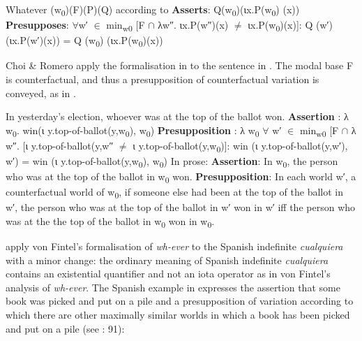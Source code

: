 \ea %
\label{bkm:Ref533762404}  Whatever (w\textsubscript{0})(F)(P)(Q) according to \citet{Fintel2000}
\ea  \textbf{Asserts}: Q(w\textsubscript{0})(ιx.P(w\textsubscript{0}) (x))
\ex \textbf{Presupposes}: ${\forall}$w′ ${\in}$ min\textsubscript{w0} [F ${\cap}$ λw″. ιx.P(w″)(x) ${\neq}$ ιx.P(w\textsubscript{0})(x)]: Q (w′) (ιx.P(w′)(x)) = Q (w\textsubscript{0}) (ιx.P(w\textsubscript{0})(x))
\z
\z

Choi \& Romero apply the formalisation in  to the sentence in . The modal base F is counterfactual, and thus a presupposition of counterfactual variation is conveyed, as in .

\ea \label{bkm:Ref150779072} %
\ea In yesterday’s election, whoever was at the top of the ballot won.
\ea \textbf{Assertion} : λ w\textsubscript{0}. win(ι y.top-of-ballot(y,w\textsubscript{0}), w\textsubscript{0})
\ex \textbf{Presupposition} \label{ex:key:100b}: λ w\textsubscript{0} ${\forall}$ w′ ${\in}$ min\textsubscript{w0} [F ${\cap}$ λ w″. [ι y.top-of-ballot(y,w″ ${\neq}$ ι y.top-of-ballot(y,w\textsubscript{0})]: win (ι y.top-of-ballot(y,w′), w′) = win (ι y.top-of-ballot(y,w\textsubscript{0}), w\textsubscript{0})
\z
\ex In prose: 
\ea \textbf{Assertion}: In w\textsubscript{0}, the person who was at the top of the ballot in w\textsubscript{0} won.
\ex \textbf{Presupposition}: In each world w′, a counterfactual world of w\textsubscript{0}, if someone else had been at the top of the ballot in w′, the person who was at the top of the ballot in w′ won in w′ iff the person who was at the the top of the ballot in w\textsubscript{0} won in w\textsubscript{0}.
\z
\z
\z 

\citet{ChoiRomero2008} apply von Fintel’s formalisation of \textit{wh-ever} to the Spanish indefinite \textit{cualquiera} with a minor change: the ordinary meaning of Spanish indefinite \textit{cualquiera} contains an existential quantifier and not an iota operator as in von Fintel’s analysis of \textit{wh-ever}. The Spanish example in  expresses the assertion that some book was picked and put on a pile and a presupposition of variation according to which there are other maximally similar worlds in which a book has been picked and put on a pile (see \citealt{ChoiRomero2008}: 91):

